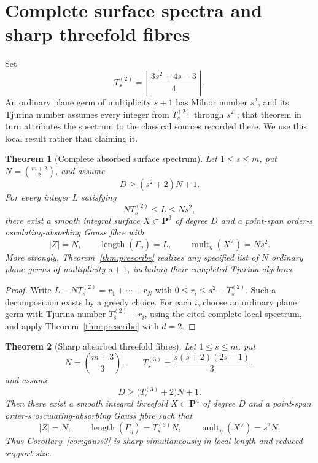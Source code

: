 \documentclass[11pt]{article}
\newtheorem{theorem}{Theorem}[section]
\theoremstyle{remark}
\newcommand{\PP}{\mathbf P}
\newcommand{\length}{\operatorname{length}}
\begin{document}
\section{Complete surface spectra and sharp threefold fibres}

Set
\[
 T^{(2)}_s=\left\lfloor\frac{3s^2+4s-3}{4}\right\rfloor.
\]
An ordinary plane germ of multiplicity \(s+1\) has Milnor number \(s^2\),
and its Tjurina number assumes every integer from \(T^{(2)}_s\) through
\(s^2\) \cite[Theorem~5.1]{CaninoEtAlArxiv}; that theorem in turn attributes
the spectrum to the classical sources recorded there.  We use this local
result rather than claiming it.

\begin{theorem}[Complete absorbed surface spectrum]\label{thm:spectrum2}
Let \(1\le s\le m\), put \(N=\binom{m+2}{2}\), and assume
\[
 D\ge(s^2+2)N+1.
\]
For every integer \(L\) satisfying
\[
 NT^{(2)}_s\le L\le Ns^2,
\]
there exist a smooth integral surface \(X\subset\PP^3\) of degree \(D\)
and a point-span order-\(s\) osculating-absorbing Gauss fibre with
\[
 |Z|=N,
 \qquad \length(\Gamma_\eta)=L,
 \qquad \operatorname{mult}_{\eta}(X^\vee)=Ns^2.
\]
More strongly, Theorem~\ref{thm:prescribe} realizes any specified list
of \(N\) ordinary plane germs of multiplicity \(s+1\), including their
completed Tjurina algebras.
\end{theorem}

\begin{proof}
Write \(L-NT^{(2)}_s=r_1+\cdots+r_N\) with
\(0\le r_i\le s^2-T^{(2)}_s\).  Such a decomposition exists by a greedy
choice.  For each \(i\), choose an ordinary plane germ with Tjurina number
\(T^{(2)}_s+r_i\), using the cited complete local spectrum, and apply
Theorem~\ref{thm:prescribe} with \(d=2\).
\end{proof}

\begin{theorem}[Sharp absorbed threefold fibres]\label{thm:global3}
Let \(1\le s\le m\), put
\[
 N=\binom{m+3}{3},
 \qquad T^{(3)}_s=\frac{s(s+2)(2s-1)}3,
\]
and assume
\[
 D\ge\bigl(T^{(3)}_s+2\bigr)N+1.
\]
Then there exist a smooth integral threefold
\(X\subset\PP^4\) of degree \(D\) and a point-span order-\(s\)
osculating-absorbing Gauss fibre such that
\[
 |Z|=N,
 \qquad
 \length(\Gamma_\eta)=T^{(3)}_sN,
 \qquad
 \operatorname{mult}_{\eta}(X^\vee)=s^3N.
\]
Thus Corollary~\ref{cor:gauss3} is sharp simultaneously in local length and
reduced support size.
\end{theorem}
\end{document}
